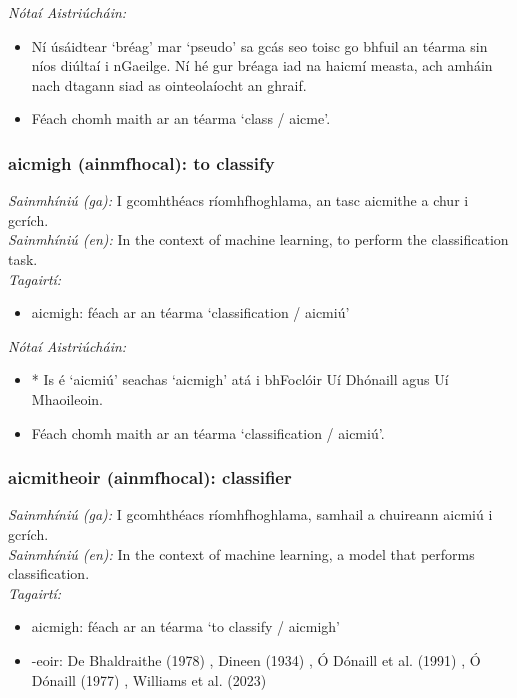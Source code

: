  \noindent \textit{Nótaí Aistriúcháin:}
\begin{itemize}
	\item Ní úsáidtear `bréag' mar `pseudo' sa gcás seo toisc go bhfuil an téarma sin níos diúltaí i nGaeilge. Ní hé gur bréaga iad na haicmí measta, ach amháin nach dtagann siad as ointeolaíocht an ghraif.
	\item Féach chomh maith ar an téarma `class / aicme'.
\end{itemize}


\subsubsection*{aicmigh (ainmfhocal): to classify}
 \noindent \textit{Sainmhíniú (ga):} I gcomhthéacs ríomhfhoghlama, an tasc aicmithe a chur i gcrích.
\\
 \noindent \textit{Sainmhíniú (en):} In the context of machine learning, to perform the classification task.
\\
 \noindent \textit{Tagairtí:}
\begin{itemize}
	\item aicmigh: féach ar an téarma `classification / aicmiú'
\end{itemize}

 \noindent \textit{Nótaí Aistriúcháin:}
\begin{itemize}
	\item * Is é `aicmiú' seachas `aicmigh' atá i bhFoclóir Uí Dhónaill agus Uí Mhaoileoin.
	\item Féach chomh maith ar an téarma `classification / aicmiú'.
\end{itemize}


\subsubsection*{aicmitheoir (ainmfhocal): classifier}
 \noindent \textit{Sainmhíniú (ga):} I gcomhthéacs ríomhfhoghlama, samhail a chuireann aicmiú i gcrích.
\\
 \noindent \textit{Sainmhíniú (en):} In the context of machine learning, a model that performs classification.
\\
 \noindent \textit{Tagairtí:}
\begin{itemize}
	\item aicmigh: féach ar an téarma `to classify / aicmigh'
	\item -eoir: De Bhaldraithe (1978) \cite{de-bhaldraithe}, Dineen (1934) \cite{dineen}, Ó Dónaill et al. (1991) \cite{focloir-beag}, Ó Dónaill (1977) \cite{odonaill}, Williams et al. (2023) \cite{storchiste}
\end{itemize}

